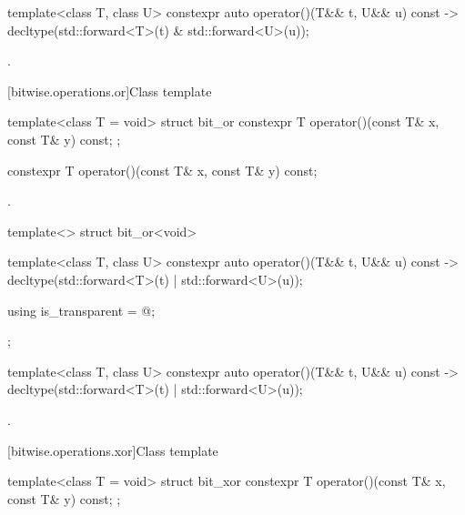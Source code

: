 %
\begin{itemdecl}
template<class T, class U> constexpr auto operator()(T&& t, U&& u) const
    -> decltype(std::forward<T>(t) & std::forward<U>(u));
\end{itemdecl}

\begin{itemdescr}
\pnum\returns {}.
\end{itemdescr}

[bitwise.operations.or]{Class template }

%
\begin{itemdecl}
template<class T = void> struct bit_or {
  constexpr T operator()(const T& x, const T& y) const;
};
\end{itemdecl}

%
\begin{itemdecl}
constexpr T operator()(const T& x, const T& y) const;
\end{itemdecl}

\begin{itemdescr}
\pnum\returns {}.
\end{itemdescr}

%
\begin{itemdecl}
template<> struct bit_or<void> {
  template<class T, class U> constexpr auto operator()(T&& t, U&& u) const
    -> decltype(std::forward<T>(t) | std::forward<U>(u));

  using is_transparent = @\unspec@;
};
\end{itemdecl}

%
\begin{itemdecl}
template<class T, class U> constexpr auto operator()(T&& t, U&& u) const
    -> decltype(std::forward<T>(t) | std::forward<U>(u));
\end{itemdecl}

\begin{itemdescr}
\pnum\returns {}.
\end{itemdescr}

[bitwise.operations.xor]{Class template }

%
\begin{itemdecl}
template<class T = void> struct bit_xor {
  constexpr T operator()(const T& x, const T& y) const;
};
\end{itemdecl}

